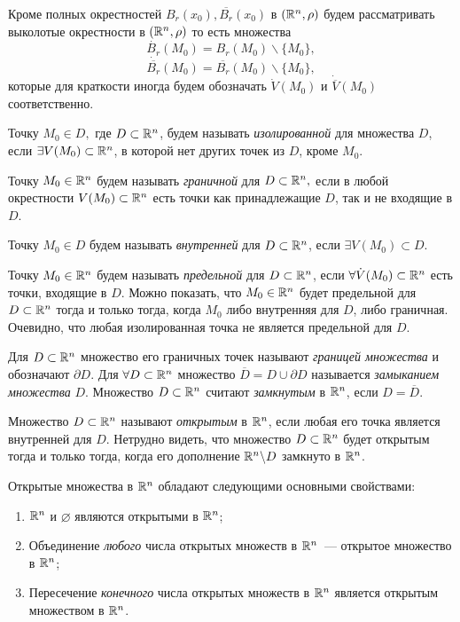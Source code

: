 \documentclass[../../main.tex]{subfiles}
\begin{document}
  \begin{rem}
    Кроме полных окрестностей $B_r(x_0), \overline{B_r}(x_0)$ в $
    (\mathbb{R}^n, \rho)$ будем рассматривать выколотые окрестности в $
    (\mathbb{R}^n, \rho)$ то есть множества
    \[
      \dot{B_r}(M_0) = B_r(M_0) \backslash \{M_0\},
    \]
    \[
      \dot{\overline{B_r}}(M_0) = \overline{B_r}(M_0) \backslash \{M_0\},
    \]
    которые для краткости иногда будем обозначать $\dot{V}(M_0) $ и 
    $\dot{\overline{V}}(M_0)$ соответственно. 
  \end{rem}
  \smallskip
  
  Точку $M_0 \in D,$ где $D \subset \mathbb{R}^n$, будем называть 
  \emph{изолированной} для множества $D$, если $\exists V(M_0) \subset 
  \mathbb{R}^n$, в которой нет других точек из $D$, кроме $M_0$.
  
  Точку $M_0 \in \mathbb{R}^n$ будем называть \emph{граничной} для $D \subset \mathbb{R}^n,
  $ если в любой окрестности $V(M_0) \subset \mathbb{R}^n$ есть точки как 
  принадлежащие $D$, так и не входящие в $D$.
  
  Точку $M_0 \in D$ будем называть \emph{внутренней} для $D \subset \mathbb{R}^n$, 
  если $\exists V(M_0) \subset D$.
  
  Точку $M_0 \in \mathbb{R}^n$ будем называть \emph{предельной} для $D \subset \mathbb{R}^n$, 
  если $\forall \dot V(M_0) \subset \mathbb{R}^n$ есть точки, входящие в $D$.
  Можно показать, что $M_0 \in \mathbb{R}^n$ будет предельной для $D \subset 
  \mathbb{R}^n$ тогда и только тогда, когда $M_0$ либо внутренняя для $D$, 
  либо граничная.
  Очевидно, что любая изолированная точка не является предельной для 
  $D$.
  
  Для $D \subset \mathbb{R}^n$ множество его граничных точек называют 
  \emph{границей множества} и обозначают $\partial D$. 
  Для $\forall D \subset \mathbb{R}^n$ множество $\overline D = D \cup \partial D$ 
  называется \emph{замыканием множества} $D$. 
  Множество $D \subset \mathbb{R}^n$ считают \emph{замкнутым} в $\mathbb{R}^n$, если
  $D = \overline D$.
  
  Множество $D \subset \mathbb{R}^n$ называют \emph{открытым} в $\mathbb{R}^n$, если любая 
  его точка является внутренней для $D$. Нетрудно видеть, что 
  множество $D \subset \mathbb{R}^n$ будет открытым тогда и только тогда, 
  когда его дополнение $\mathbb{R}^n \backslash D$ замкнуто в $\mathbb{R}^n$. 
  
  \smallskip
  Открытые множества в $\mathbb{R}^n$ обладают следующими основными 
  свойствами:
  \begin{enumerate}
    \item
     $\mathbb{R}^n$  и $\varnothing$ являются открытыми в $\mathbb{R}^n$; 
     \item
      Объединение \emph{любого} числа открытых множеств в $\mathbb{R}^n$~--- 
      открытое множество в $\mathbb{R}^n$; 
      \item Пересечение \emph{конечного} числа открытых множеств в 
      $\mathbb{R}^n$ является открытым множеством в $\mathbb{R}^n$.
  \end{enumerate}  
\end{document}
